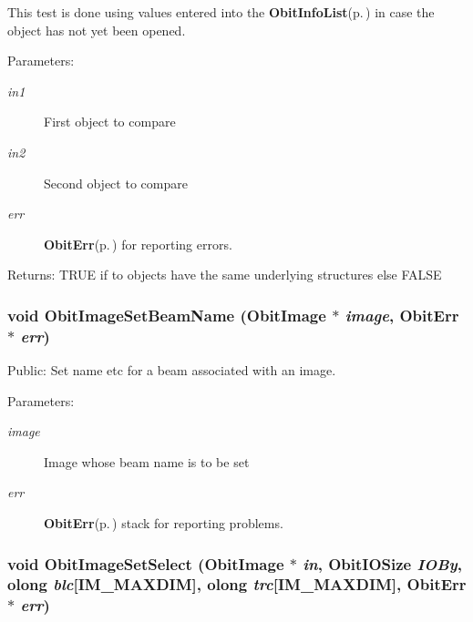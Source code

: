 This test is done using values entered into the {\bf Obit\-Info\-List}{\rm (p.\,\pageref{structObitInfoList})} in case the object has not yet been opened. \begin{Desc}
\item[Parameters:]
\begin{description}
\item[{\em in1}]First object to compare \item[{\em in2}]Second object to compare \item[{\em err}]{\bf Obit\-Err}{\rm (p.\,\pageref{structObitErr})} for reporting errors. \end{description}
\end{Desc}
\begin{Desc}
\item[Returns:]TRUE if to objects have the same underlying structures else FALSE \end{Desc}
\subsubsection{\setlength{\rightskip}{0pt plus 5cm}void Obit\-Image\-Set\-Beam\-Name ({\bf Obit\-Image} $\ast$ {\em image}, {\bf Obit\-Err} $\ast$ {\em err})}\label{ObitImage_8c_a32}


Public: Set name etc for a beam associated with an image. 

\begin{Desc}
\item[Parameters:]
\begin{description}
\item[{\em image}]Image whose beam name is to be set \item[{\em err}]{\bf Obit\-Err}{\rm (p.\,\pageref{structObitErr})} stack for reporting problems. \end{description}
\end{Desc}
\subsubsection{\setlength{\rightskip}{0pt plus 5cm}void Obit\-Image\-Set\-Select ({\bf Obit\-Image} $\ast$ {\em in}, Obit\-IOSize {\em IOBy}, {\bf olong} {\em blc}[IM\_\-MAXDIM], {\bf olong} {\em trc}[IM\_\-MAXDIM], {\bf Obit\-Err} $\ast$ {\em err})}\label{ObitImage_8c_a35}


